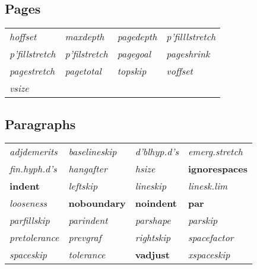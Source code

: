 \subsection*{Pages\textsuperscript{\textdagger}}

{\scriptsize\begin{tabular}{@{}l l l l}
    \textit{hoffset}         &
    \textit{maxdepth}        &
    \textit{pagedepth}       &
    \textit{p'filllstretch}  \\
    \textit{p'fillstretch}   &
    \textit{p'filstretch}    &
    \textit{pagegoal}        &
    \textit{pageshrink}      \\
    \textit{pagestretch}     &
    \textit{pagetotal}       &
    \textit{topskip}         &
    \textit{voffset}         \\
    \textit{vsize}           &
\end{tabular}}



\subsection*{Paragraphs\textsuperscript{\textdagger}}

{\scriptsize\begin{tabular}{@{}l l l l}
    \textit{adjdemerits}         &
    \textit{baselineskip}        &
    \textit{d'blhyp.d's}         &
    \textit{emerg.stretch}       \\
    \textit{fin.hyph.d's}        &
    \textit{hangafter}           &
    \textit{hsize}               &
    \textbf{ignorespaces}        \\
    \textbf{indent}              &
    \textit{leftskip}            &
    \textit{lineskip}            &
    \textit{linesk.lim}          \\
    \textit{looseness}           &
    \textbf{noboundary}          &
    \textbf{noindent}            &
    \textbf{par}                 \\
    \textit{parfillskip}         &
    \textit{parindent}           &
    \textit{parshape}            &
    \textit{parskip}             \\
    \textit{pretolerance}        &
    \textit{prevgraf}            &
    \textit{rightskip}           &
    \textit{spacefactor}         \\
    \textit{spaceskip}           &
    \textit{tolerance}           &
    \textbf{vadjust}             &
    \textit{xspaceskip}          \\   
\end{tabular}}



